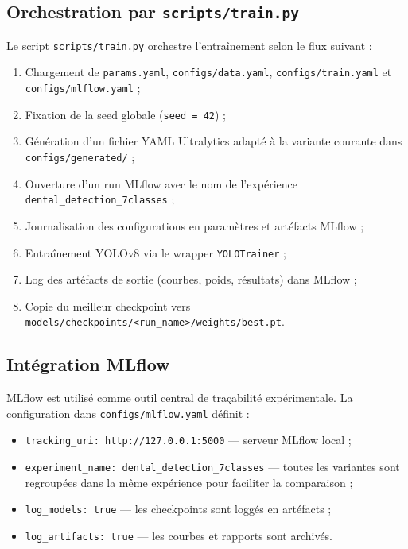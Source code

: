 \documentclass{rapportENSIAS}
\newcommand{\projectpath}[1]{\texttt{#1}}
\begin{document}
\subsection{Orchestration par \texttt{scripts/train.py}}

Le script \projectpath{scripts/train.py} orchestre l'entraînement selon
le flux suivant :

\begin{enumerate}
    \item Chargement de \texttt{params.yaml}, \texttt{configs/data.yaml},
          \texttt{configs/train.yaml} et \texttt{configs/mlflow.yaml} ;
    \item Fixation de la seed globale (\texttt{seed = 42}) ;
    \item Génération d'un fichier YAML Ultralytics adapté à la variante
          courante dans \texttt{configs/generated/} ;
    \item Ouverture d'un run MLflow avec le nom de l'expérience
          \texttt{dental\_detection\_7classes} ;
    \item Journalisation des configurations en paramètres et artéfacts MLflow ;
    \item Entraînement YOLOv8 via le wrapper \texttt{YOLOTrainer} ;
    \item Log des artéfacts de sortie (courbes, poids, résultats) dans MLflow ;
    \item Copie du meilleur checkpoint vers
          \texttt{models/checkpoints/<run\_name>/weights/best.pt}.
\end{enumerate}

\subsection{Intégration MLflow}

MLflow est utilisé comme outil central de traçabilité
expérimentale. La configuration dans \projectpath{configs/mlflow.yaml} définit :

\begin{itemize}
    \item \texttt{tracking\_uri: http://127.0.0.1:5000} — serveur MLflow local ;
    \item \texttt{experiment\_name: dental\_detection\_7classes} — toutes les
          variantes sont regroupées dans la même expérience pour faciliter la comparaison ;
    \item \texttt{log\_models: true} — les checkpoints sont loggés en artéfacts ;
    \item \texttt{log\_artifacts: true} — les courbes et rapports sont archivés.
\end{itemize}
\end{document}
